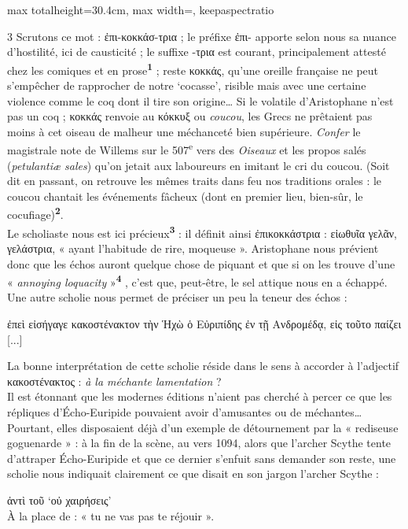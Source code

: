 \documentclass[11pt,twoside]{book}
\newcommand{\italique}[1]{\textit{#1}}
\newcommand{\citComm}[1]{\begin{quoting}[vskip=0.4pt,leftmargin=0.7em,rightmargin=0.2em]#1\end{quoting}}
\newcommand{\nieme}[1]{#1\textsuperscript{e}}
\newcommand{\latin}[1]{\textit{#1}}
\newcommand{\anglais}[1]{\textit{#1}}
\newcommand{\marqueur}[1]{\textsuperscript{\color{rubricRed}\textbf{#1}}}
\begin{document}
\begin{adjustbox}{max totalheight=30.4cm, max width=\textwidth, keepaspectratio}
\begin{minipage}{\textwidth}
{\begin{multicols}{3}
\noindent Scrutons ce mot : ἐπι-κοκκάσ-τρια ; le préfixe ἐπι- apporte selon nous sa nuance d'hostilité, ici de causticité  ; le suffixe -τρια est courant, principalement attesté chez les comiques et en prose\marqueur{1} ; reste κοκκάς, qu'une oreille française ne peut s'empêcher de rapprocher de notre `cocasse', risible mais avec une certaine violence comme le coq dont il tire son origine…  Si le volatile d'Aristophane n'est pas un coq ; κοκκάς renvoie au κόκκυξ ou \italique{coucou}, les Grecs ne prêtaient pas moins à cet oiseau de malheur une méchanceté bien supérieure. \italique{Confer} le magistrale note de Willems sur le \nieme{507} vers des \italique{Oiseaux} et les propos salés (\latin{petulantiæ sales}) qu'on jetait aux laboureurs en imitant le cri du coucou. (Soit dit en passant, on retrouve les mêmes traits dans feu nos traditions orales : le coucou chantait les événements fâcheux (dont en premier lieu, bien-sûr, le cocufiage)\marqueur{2}.\\ Le scholiaste nous est ici précieux\marqueur{3} : il définit ainsi ἐπικοκκάστρια : εἰωθυῖα γελᾶν, γελάστρια, « ayant l'habitude de rire, moqueuse ». Aristophane nous prévient donc que les échos auront quelque chose de piquant et que si on les trouve d'une « \anglais{annoying loquacity} »\marqueur{4} , c'est que, peut-être, le sel attique nous en a échappé.\\ Une autre scholie nous permet de préciser un peu la teneur des échos :
\citComm{ἐπεὶ εἰσήγαγε κακοστένακτον τὴν Ἡχὼ ὁ Εὐριπίδης ἐν τῇ Ανδρομέδᾳ, εἰς τοῦτο παίζει [...]}
\par\vspace{1.5pt}
\noindent La bonne interprétation de cette scholie réside dans le sens à accorder à l'adjectif κακοστένακτος : \italique{à la méchante lamentation} ?\\ Il est étonnant que les modernes éditions n'aient pas cherché à percer ce que les répliques d'Écho-Euripide pouvaient avoir d'amusantes ou de méchantes… Pourtant, elles disposaient déjà d'un exemple de détournement par la « rediseuse goguenarde » : à la fin de la scène, au vers 1094, alors que l'archer Scythe tente d'attraper Écho-Euripide et que ce dernier s'enfuit sans demander son reste, une scholie nous indiquait clairement ce que disait en son jargon l'archer Scythe :
\citComm{ἀντὶ τοῦ `οὐ χαιρήσεις'\\
À la place de : « tu ne vas pas te réjouir ».}
\par\vspace{1.5pt}

\end{multicols}}
\end{minipage}
\end{adjustbox}
\end{document}
